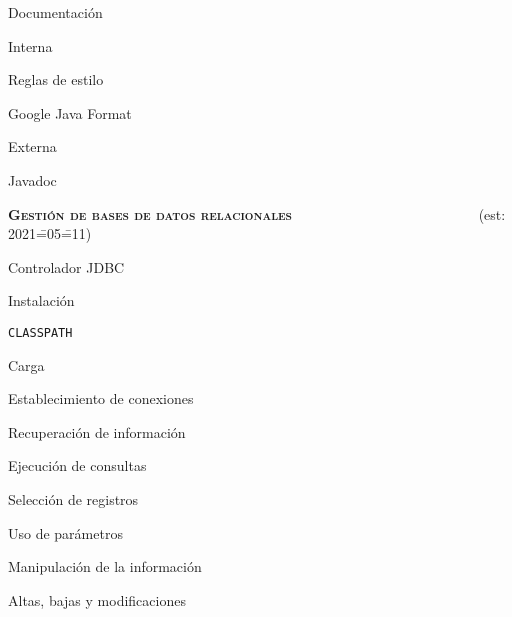 \begin{longenum}
\begin{longenum}
\begin{longenum}
        \end{longenum}
        \item Documentación
        \begin{longenum}
            \item Interna
            \begin{longenum}
                \item Reglas de estilo
                \item Google Java Format
            \end{longenum}
            \item Externa
            \begin{longenum}
                \item Javadoc
            \end{longenum}
        \end{longenum}
    \end{longenum}
    \item \textbf{\textsc{Gestión de bases de datos relacionales}} \ \ \ \ \ \ \ \ \ \ \ \ \ \ \ \ \ \ \ \ \ \ \ \ \ \ (est: 2021\==05\==11)
    \begin{longenum}
        \item Controlador JDBC
        \begin{longenum}
            \item Instalación
            \item \texttt{CLASSPATH}
            \item Carga
        \end{longenum}
        \item Establecimiento de conexiones
        \item Recuperación de información
        \begin{longenum}
            \item Ejecución de consultas
            \item Selección de registros
            \item Uso de parámetros
        \end{longenum}
        \item Manipulación de la información
        \begin{longenum}
            \item Altas, bajas y modificaciones
        \end{longenum}

\end{longenum}
\end{longenum}
